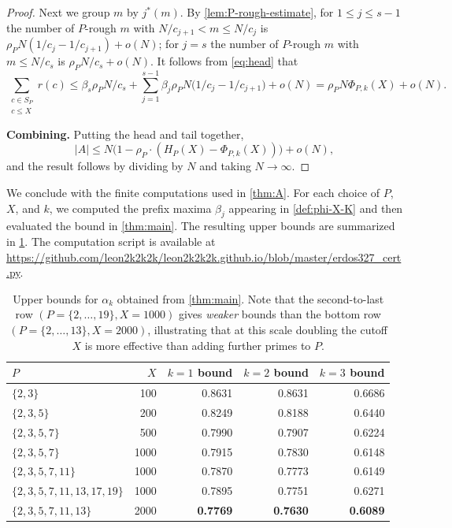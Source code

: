 \documentclass{amsart}
\begin{document}
\begin{proof}
Next we group $m$ by $j^*(m)$. By \cref{lem:P-rough-estimate}, for $1 \leq j \leq s-1$ the number of $P$-rough $m$ with $N/c_{j+1} < m \leq N/c_{j}$ is $\rho_P N (1/c_j - 1/c_{j+1}) + o(N)$; for $j = s$ the number of $P$-rough $m$ with $m \leq N/c_s$ is $\rho_P N/c_s + o(N)$. It follows from \cref{eq:head} that
\begin{equation}
\sum_{\substack{c \in S_P \\ c \leq X}} r(c) \leq \beta_s \rho_P N/c_s + \sum_{j =1}^{s-1} \beta_j \rho_P N \big(1/c_j - 1/c_{j+1}\big) + o(N)  = \rho_P N \Phi_{P,k}(X) + o(N).
\end{equation}

\smallskip\noindent\textbf{Combining.} Putting the head and tail together,
\begin{equation}
|A| \leq N\big(1 - \rho_P \cdot (H_P(X) - \Phi_{P,k}(X))\big) + o(N),
\end{equation}
and the result follows by dividing by $N$ and taking $N \to \infty$.
\end{proof}

We conclude with the finite computations used in \cref{thm:A}. For each choice of $P$, $X$, and $k$, we computed the prefix maxima $\beta_j$ appearing in \cref{def:phi-X-K} and then evaluated the bound in \cref{thm:main}. The resulting upper bounds are summarized in \cref{tab:fiber}. The computation script is available at \url{https://github.com/leon2k2k2k/leon2k2k2k.github.io/blob/master/erdos327_cert.py}.

\begin{table}[h]
\centering
\begin{tabular}{lrrrr}
\toprule
$P$ & $X$ & $k=1$ bound & $k=2$ bound & $k=3$ bound \\
\midrule
$\{2,3\}$                  &   100  & 0.8631 & 0.8631 & 0.6686 \\
$\{2,3,5\}$                &   200  & 0.8249 & 0.8188 & 0.6440 \\
$\{2,3,5,7\}$              &   500  & 0.7990 & 0.7907 & 0.6224 \\
$\{2,3,5,7\}$              &  1000  & 0.7915 & 0.7830 & 0.6148 \\
$\{2,3,5,7,11\}$           &  1000  & 0.7870 & 0.7773 & 0.6149 \\
$\{2,3,5,7,11,13,17,19\}$  &  1000  & 0.7895 & 0.7751 & 0.6271 \\
$\{2,3,5,7,11,13\}$        &  2000  & \textbf{0.7769} & \textbf{0.7630} & \textbf{0.6089} \\
\bottomrule
\end{tabular}
\caption{Upper bounds for $\alpha_k$ obtained from \cref{thm:main}. Note that
the second-to-last row $(P = \{2, \ldots, 19\}, X = 1000)$ gives \emph{weaker}
bounds than the bottom row $(P = \{2, \ldots, 13\}, X = 2000)$, illustrating
that at this scale doubling the cutoff $X$ is more effective than adding
further primes to $P$.}
\label{tab:fiber}
\end{table}
\end{document}
